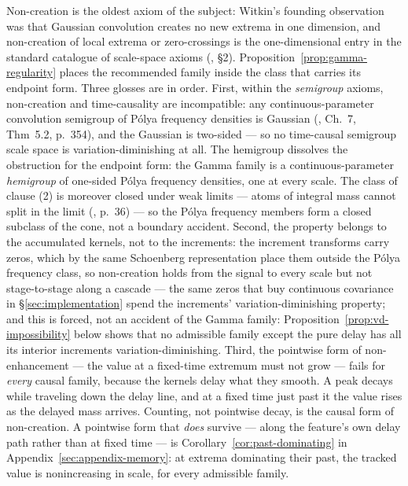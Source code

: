 \begin{remark}\label{rem:pf-hemigroup}
Non-creation is the oldest axiom of the subject: Witkin's founding observation was that
Gaussian convolution creates no new extrema in one dimension, and non-creation of local
extrema or zero-crossings is the one-dimensional entry in the standard catalogue of
scale-space axioms (, \S2).
Proposition~\ref{prop:gamma-regularity} places the recommended family inside the class that
carries its endpoint form. Three glosses are in order. First, within the \emph{semigroup} axioms, non-creation and
time-causality are incompatible: any continuous-parameter convolution semigroup of P\'olya
frequency densities is Gaussian (, Ch.~7, Thm~5.2, p.~354), and the
Gaussian is two-sided --- so no time-causal semigroup scale space is variation-diminishing
at all. The hemigroup dissolves the obstruction for the endpoint form: the Gamma family is a continuous-parameter
\emph{hemigroup} of one-sided P\'olya frequency densities, one at every scale. The class of
clause (2) is moreover closed under weak limits --- atoms of integral mass cannot split in
the limit (, p.~36) --- so the P\'olya frequency members
form a closed subclass of the cone, not a boundary accident. Second, the
property belongs to the accumulated kernels, not to the increments: the increment
transforms carry zeros, which by the same Schoenberg representation place them outside the
P\'olya frequency class, so non-creation holds from the signal to every scale but not
stage-to-stage along a cascade --- the same zeros that buy continuous covariance in
\S\ref{sec:implementation} spend the increments' variation-diminishing property; and this
is forced, not an accident of the Gamma family:
Proposition~\ref{prop:vd-impossibility} below shows that no admissible family except the
pure delay has all its interior increments variation-diminishing. Third, the
pointwise form of non-enhancement --- the value at a fixed-time extremum must not grow ---
fails for \emph{every} causal family, because the kernels delay what they smooth. A peak
decays while traveling down the delay line, and at a fixed time just past it the value
rises as the delayed mass arrives. Counting, not pointwise decay, is the causal form of
non-creation. A pointwise form that \emph{does} survive --- along the feature's own delay
path rather than at fixed time --- is Corollary~\ref{cor:past-dominating} in
Appendix~\ref{sec:appendix-memory}: at extrema dominating their past, the tracked value is
nonincreasing in scale, for every admissible family.
\end{remark}

